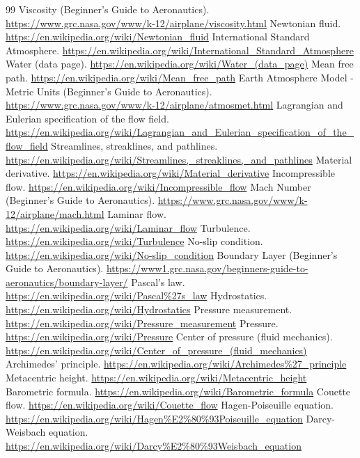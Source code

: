 \documentclass[10pt,openany]{book}
\begin{document}
\begin{thebibliography}{99}
 Viscosity (Beginner's Guide to Aeronautics). \url{https://www.grc.nasa.gov/www/k-12/airplane/viscosity.html}
 Newtonian fluid. \url{https://en.wikipedia.org/wiki/Newtonian_fluid}
 International Standard Atmosphere. \url{https://en.wikipedia.org/wiki/International_Standard_Atmosphere}
 Water (data page). \url{https://en.wikipedia.org/wiki/Water_(data_page)}
 Mean free path. \url{https://en.wikipedia.org/wiki/Mean_free_path}
 Earth Atmosphere Model - Metric Units (Beginner's Guide to Aeronautics). \url{https://www.grc.nasa.gov/www/k-12/airplane/atmosmet.html}
 Lagrangian and Eulerian specification of the flow field. \url{https://en.wikipedia.org/wiki/Lagrangian_and_Eulerian_specification_of_the_flow_field}
 Streamlines, streaklines, and pathlines. \url{https://en.wikipedia.org/wiki/Streamlines,_streaklines,_and_pathlines}
 Material derivative. \url{https://en.wikipedia.org/wiki/Material_derivative}
 Incompressible flow. \url{https://en.wikipedia.org/wiki/Incompressible_flow}
 Mach Number (Beginner's Guide to Aeronautics). \url{https://www.grc.nasa.gov/www/k-12/airplane/mach.html}
 Laminar flow. \url{https://en.wikipedia.org/wiki/Laminar_flow}
 Turbulence. \url{https://en.wikipedia.org/wiki/Turbulence}
 No-slip condition. \url{https://en.wikipedia.org/wiki/No-slip_condition}
 Boundary Layer (Beginner's Guide to Aeronautics). \url{https://www1.grc.nasa.gov/beginners-guide-to-aeronautics/boundary-layer/}
 Pascal's law. \url{https://en.wikipedia.org/wiki/Pascal%27s_law}
 Hydrostatics. \url{https://en.wikipedia.org/wiki/Hydrostatics}
 Pressure measurement. \url{https://en.wikipedia.org/wiki/Pressure_measurement}
 Pressure. \url{https://en.wikipedia.org/wiki/Pressure}
 Center of pressure (fluid mechanics). \url{https://en.wikipedia.org/wiki/Center_of_pressure_(fluid_mechanics)}
 Archimedes' principle. \url{https://en.wikipedia.org/wiki/Archimedes%27_principle}
 Metacentric height. \url{https://en.wikipedia.org/wiki/Metacentric_height}
 Barometric formula. \url{https://en.wikipedia.org/wiki/Barometric_formula}
 Couette flow. \url{https://en.wikipedia.org/wiki/Couette_flow}
 Hagen-Poiseuille equation. \url{https://en.wikipedia.org/wiki/Hagen%E2%80%93Poiseuille_equation}
 Darcy-Weisbach equation. \url{https://en.wikipedia.org/wiki/Darcy%E2%80%93Weisbach_equation}

\end{thebibliography}
\end{document}
